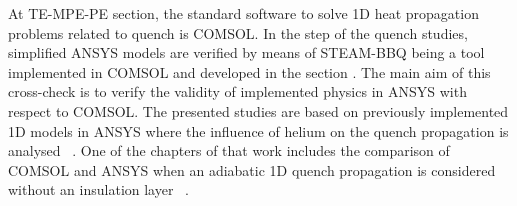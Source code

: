 
At TE-MPE-PE section, the standard software to solve 1D heat propagation problems related to quench is COMSOL. In the  step of the quench studies, simplified ANSYS models are verified by means of STEAM-BBQ being a tool implemented in COMSOL and developed in the section \cite{BBQ_manual}. The main aim of this cross-check is to verify the validity of implemented physics in ANSYS with respect to COMSOL. The presented studies are based on previously implemented 1D models in ANSYS where the influence of helium on the quench propagation is analysed~\cite{paudel_thesis} . One of the chapters of that work includes the comparison of COMSOL and ANSYS when an adiabatic 1D quench propagation is considered without an insulation layer~\cite{paudel_thesis} .
